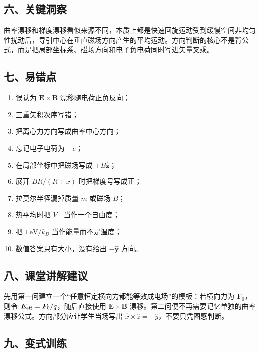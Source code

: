 \documentclass[12pt,a4paper,UTF8]{ctexart}
\newcommand{\tightlist}{\setlength{\itemsep}{0pt}\setlength{\parskip}{0pt}}
\begin{document}
\subsection{六、关键洞察}\label{ux516dux5173ux952eux6d1eux5bdf-5}

曲率漂移和梯度漂移看似来源不同，本质上都是快速回旋运动受到缓慢空间非均匀性扰动后，导引中心在垂直磁场方向产生的平均运动。方向判断的核心不是背公式，而是把局部坐标系、磁场方向和电子负电荷同时写进矢量叉乘。

\subsection{七、易错点}\label{ux4e03ux6613ux9519ux70b9-5}

\begin{enumerate}
\def\labelenumi{\arabic{enumi}.}
\tightlist
\item
  误认为 \(\boldsymbol E\times\boldsymbol B\) 漂移随电荷正负反向；
\item
  三重矢积次序写错；
\item
  把离心力方向写成曲率中心方向；
\item
  忘记电子电荷为 \(-e\)；
\item
  在局部坐标中把磁场写成 \(+B\hat{\boldsymbol z}\)；
\item
  展开 \(BR/(R+x)\) 时把梯度号写成正；
\item
  拉莫尔半径漏掉质量 \(m\) 或磁场 \(B\)；
\item
  热平均时把 \(V_\perp\) 当作一个自由度；
\item
  把 \(1\,\mathrm{eV}/k_B\) 当作能量而不是温度；
\item
  数值答案只有大小，没有给出 \(-\hat{\boldsymbol y}\) 方向。
\end{enumerate}

\subsection{八、课堂讲解建议}\label{ux516bux8bfeux5802ux8bb2ux89e3ux5efaux8bae-5}

先用第一问建立一个``任意恒定横向力都能等效成电场''的模板：若横向力为
\(\boldsymbol F_0\)，则令
\(\boldsymbol E_{\rm eff}=\boldsymbol F_0/q\)，随后直接使用
\(\boldsymbol E\times\boldsymbol B\)
漂移。第二问便不再需要记忆单独的曲率漂移公式。方向部分应让学生当场写出
\(\hat x\times\hat z=-\hat y\)，不要只凭图感判断。

\subsection{九、变式训练}\label{ux4e5dux53d8ux5f0fux8badux7ec3-5}
\end{document}
